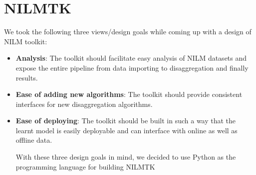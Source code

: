 \documentclass{sig-alternate}
\begin{document}
\section{NILMTK}
We took the following three views/design goals while coming up with a design of NILM toolkit:
\begin{itemize}
\item \textbf{Analysis}: The toolkit should facilitate easy analysis of NILM datasets and expose the entire pipeline from data importing to disaggregation and finally results. 
\item \textbf{Ease of adding new algorithms}: The toolkit should provide consistent interfaces for new disaggregation algorithms.
\item \textbf{Ease of deploying}: The toolkit should be built in such a way that the learnt model is easily deployable and can interface with online as well as offline data.

With these three design goals in mind, we decided to use Python as the programming language for building NILMTK
\end{itemize}


\end{document}
